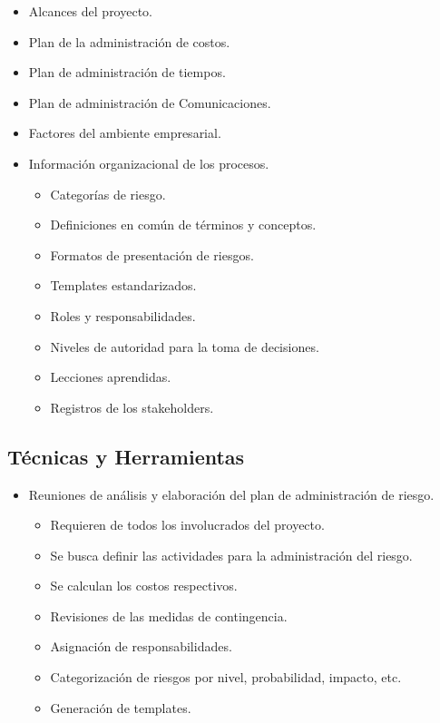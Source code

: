 \begin{itemize}
    \item Alcances del proyecto.
    \item Plan de la administración de costos.
    \item Plan de administración de tiempos.
    \item Plan de administración de Comunicaciones.
    \item Factores del ambiente empresarial.
    \item Información organizacional de los procesos.
    \begin{itemize}
        \item Categorías de riesgo.
        \item Definiciones en común de términos y conceptos.
        \item Formatos de presentación de riesgos.
        \item Templates estandarizados.
        \item Roles y responsabilidades.
        \item Niveles de autoridad para la toma de decisiones.
        \item Lecciones aprendidas.
        \item Registros de los stakeholders.
    \end{itemize}
\end{itemize}

\subsection{Técnicas y Herramientas}
\begin{itemize}
    \item Reuniones de análisis y elaboración del plan de administración de riesgo.
    \begin{itemize}
        \item Requieren de todos los involucrados del proyecto.
        \item Se busca definir las actividades para la administración del
        riesgo.
        \item Se calculan los costos respectivos.
        \item Revisiones de las medidas de contingencia.
        \item Asignación de responsabilidades.
        \item Categorización de riesgos por nivel, probabilidad, impacto, etc.
        \item Generación de templates.
    \end{itemize}
\end{itemize}

